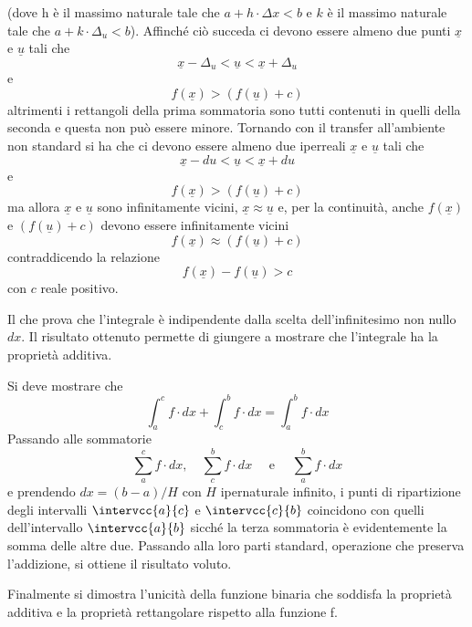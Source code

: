 (dove h è il massimo naturale tale che 
\(a+h \cdot \Delta x < b\) 
e \(k\) è il massimo naturale tale che
\(a+k \cdot \Delta_u < b\)).
Affinché ciò succeda ci devono essere almeno 
due punti 
\(\underline{x}\) e \(\underline{u}\)
tali che 
\[\underline{x} - \Delta_u < \underline{u} < \underline{x} + \Delta_u \]
e 
\[f(\underline{x}) > (f(\underline{u})+c)\] 
altrimenti i rettangoli della prima sommatoria sono tutti contenuti in quelli 
della seconda e questa non può essere minore. Tornando con il transfer 
all'ambiente non standard si ha che ci devono essere almeno due iperreali 
\(\underline{x}\) e \(\underline{u}\)
tali che 
\[\underline{x} - du < \underline{u} < \underline{x}+ du\]
e 
\[f(\underline{x}) > (f(\underline{u})+c)\] 
ma allora \(\underline{x}\) e \(\underline{u}\)
sono infinitamente vicini,  
\(\underline{x} \approx \underline{u}\)
e, per la continuità, anche 
\(f(\underline{x})\) e \((f(\underline{u})+c)\) 
devono essere infinitamente vicini 
\[f(\underline{x}) \approx (f(\underline{u})+c)\] 
contraddicendo la relazione 
\[f(\underline{x}) - f(\underline{u}) > c\]
con \(c\) reale positivo. 

Il che prova che l'integrale è indipendente dalla scelta dell'infinitesimo non 
nullo $dx$.
Il risultato ottenuto permette di giungere a mostrare che 
l'integrale ha la proprietà additiva.

Si deve mostrare che 
\[\int_a^c f \cdot dx + \int_c^b f \cdot dx = \int_a^b f \cdot dx\] 
Passando alle sommatorie 
\[\sum_a^c f \cdot dx,\quad \sum_c^b f \cdot dx \quad\text{ e } \quad 
  \sum_a^b f \cdot dx\] 
e prendendo 
\(dx = (b-a)/H\)
con \(H\) ipernaturale infinito, 
i punti di ripartizione degli intervalli \(\intervcc{a}{c}\) e 
\(\intervcc{c}{b}\) coincidono con quelli dell'intervallo \(\intervcc{a}{b}\)
sicché la terza sommatoria è evidentemente la somma delle altre due.
Passando alla loro parti standard, operazione che preserva l'addizione, si 
ottiene il risultato voluto. 

Finalmente si dimostra l'unicità della funzione binaria che soddisfa la 
proprietà additiva e la proprietà rettangolare rispetto alla funzione f.

